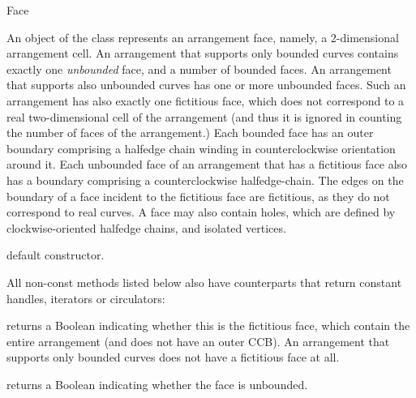 
\ccRefPageBegin

\begin{ccRefClass}{Face}

\ccDefinition
An object of the class \ccRefName{} represents an arrangement face,
namely, a $2$-dimensional arrangement cell. An arrangement that supports
only bounded curves contains exactly one \emph{unbounded} face, and a
number of bounded faces. An arrangement that supports also unbounded
curves has one or more unbounded faces. Such an arrangement has also
exactly one fictitious face, which does not correspond to a real
two-dimensional cell of the arrangement (and thus it is ignored in
counting the number of faces of the arrangement.)
Each bounded face has an outer boundary comprising a halfedge chain
winding in counterclockwise orientation around it. Each unbounded face of
an arrangement that has a fictitious face also has a boundary comprising
a counterclockwise halfedge-chain. The edges on the boundary of a face
incident to the fictitious face are fictitious, as they do not correspond
to real curves. A face may also contain holes, which are defined by
clockwise-oriented halfedge chains, and isolated vertices.

\ccInheritsFrom

\ccCreation
{}

   {default constructor.}    	    
    
\ccAccessFunctions

All non-const methods listed below also have  counterparts
that return constant handles, iterators or circulators:

  {returns a Boolean indicating whether this is the fictitious face,
  which contain the entire arrangement (and does not have an outer CCB).
  An arrangement that supports only bounded curves does not have a
  fictitious face at all.}

  {returns a Boolean indicating whether the face is unbounded.}    


\end{ccRefClass}
